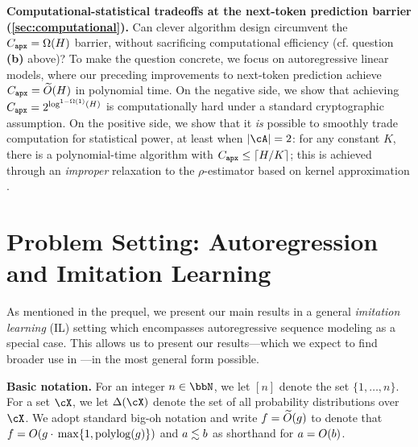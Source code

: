 \vspace{0.3em}
\noindent\textbf{Computational-statistical tradeoffs at the next-token prediction barrier (\cref{sec:computational}).}
Can clever algorithm design circumvent the
$C_{\texttt{apx}}=\Omega(H)$ barrier, without sacrificing computational
efficiency (cf. question \textbf{(b)} above)? To make the question concrete, we focus on autoregressive
linear models, where our preceding improvements to next-token
prediction achieve $C_{\texttt{apx}}=\widetilde{O}(H)$
in polynomial time. On the negative side, we show that achieving $C_{\texttt{apx}} =2^{\log^{1-\Omega(1)}(H)}$ is computationally hard under a standard
cryptographic assumption.
On the positive side, we show that it \emph{is}
possible to smoothly trade computation for statistical power, at least when $\abs{\cA}=2$: for
any constant $K$, there is a polynomial-time algorithm 
with $C_{\texttt{apx}} \leq \lceil H/K\rceil$; this is achieved through an
\emph{improper} relaxation to the $\rho$-estimator based on kernel
approximation \citep{shalev2011learning}.\loose








\section{Problem Setting: Autoregression and Imitation Learning}\label{sec:setting}



As mentioned in the prequel, we present our main results in a general 
\emph{imitation learning} (IL) setting which encompasses autoregressive sequence modeling as a special case. %
This allows us to present
  our results---which we expect to find broader use in \IL{}---in the most general form possible.\loose

\vspace{0.3em}
\noindent\textbf{Basic notation.}
  For an integer $n\in\bbN$, we let $[n]$ denote the set
  $\{1,\dots,n\}$. For a set $\cX$, we let $\Delta(\cX)$ denote the
  set of all probability distributions over $\cX$. We adopt
    standard big-oh notation and write $f=\widetilde{O}(g)$ to denote that
    $f = \bigoh(g\cdot{}\max\crl*{1,\mathrm{polylog}(g)})$ and
    $a\lesssim{}b$ as shorthand for $a=O(b)$. \loose
  


